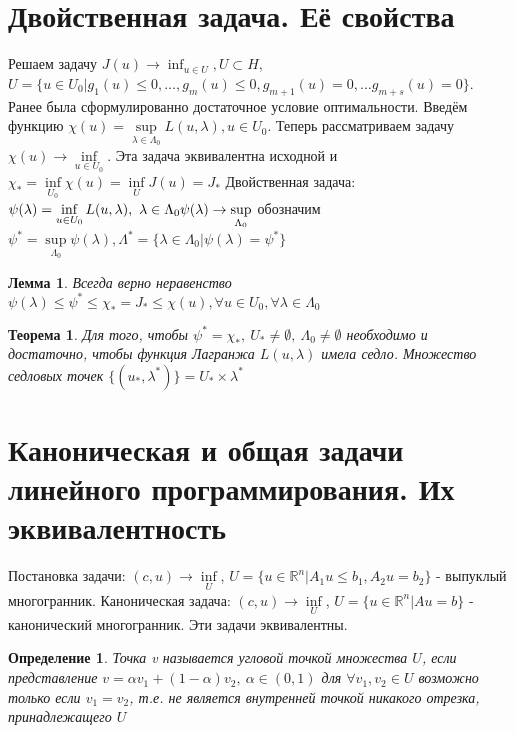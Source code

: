\documentclass[9pt, a4paper]{extarticle}
\newtheorem*{theorem*}{Теорема}
\newtheorem*{lemma}{Лемма}
\newtheorem*{definition}{Определение}
\begin{document}
\section{Двойственная задача. Её свойства}
	Решаем задачу $J(u) \to \inf_{u\in U}, U\subset H$, $U = \{u \in U_0 \vert g_1(u) \leq 0, \dots, g_m(u) \leq 0, g_{m+1}(u) =0, \dots g_{m+s}(u) = 0\}$. Ранее была сформулированно достаточное условие оптимальности.\newline
	Введём функцию $\chi(u) = \sup\limits_{\lambda \in \Lambda_0} L(u, \lambda), u \in U_0$. Теперь рассматриваем задачу 
	$\chi(u) \to \inf\limits_{u\in U_0}$. Эта задача эквивалентна исходной и $\chi_* = \inf\limits_{U_0} \chi(u) = \inf\limits_UJ(u) = J_*$\newline
	Двойственная задача:\newline
	\begin{math}
		\psi(\lambda) = \inf\limits_{u \in U_0} L(u, \lambda), \ \lambda \in \Lambda_0 \\
		\psi(\lambda) \to \sup\limits_{\Lambda_0}
	\end{math}
	\newline обозначим $\psi^* = \sup\limits_{\Lambda_0} \psi(\lambda), \Lambda^* = \{\lambda \in \Lambda_0\vert \psi(\lambda) = \psi^*\}$
	\begin{lemma}
		Всегда верно неравенство $\psi(\lambda) \leq \psi^* \leq \chi_* = J_* \leq \chi(u), \forall u \in U_0, \forall \lambda \in \Lambda_0$
	\end{lemma}
	\begin{theorem*}
	Для того, чтобы $\psi^* = \chi_*, \ U_* \neq \emptyset, \ \Lambda_0 \neq \emptyset$ необходимо и достаточно, чтобы функция Лагранжа $L(u, \lambda)$ имела седло. Множество седловых точек $\{(u_*, \lambda^*)\} = U_* \times \lambda^*$
	\end{theorem*}
\section{Каноническая и общая задачи линейного программирования. Их эквивалентность}
	Постановка задачи: \newline
	$(c,u) \to \inf\limits_U$, $U = \{u \in \mathbb{R}^n \vert A_1 u \leq b_1, A_2 u  = b_2\}$ - выпуклый многогранник. 
	\newline
	Каноническая задача:
	\newline
	$(c,u) \to \inf\limits_U$, $U = \{u \in \mathbb{R}^n \vert Au = b\}$ - канонический многогранник. 
	\newline
	Эти задачи эквивалентны.
	\begin{definition}
		Точка v называется угловой точкой множества $U$, если представление $v = \alpha v_1 + (1-\alpha) v_2, \ \alpha \in (0,1)$ для $\forall v_1, v_2 \in U$ возможно только если $v_1 = v_2$, т.е. не является внутренней точкой никакого отрезка, принадлежащего $U$
	\end{definition}
\end{document}

